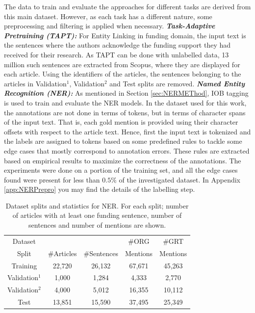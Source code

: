 \documentclass{report}
\theoremstyle{definition}
\theoremstyle{remark}
\begin{document}
The data to train and evaluate the approaches for different tasks are derived from this main dataset. However, as each task has a different nature, some preprocessing and filtering is applied when necessary. 
\newline
\newline
\textit{\textbf{Task-Adaptive Pretraining (TAPT):}} For Entity Linking in funding domain, the input text is the sentences where the authors acknowledge the funding support they had received for their research. As TAPT can be done with unlabelled data, 13 million such sentences are extracted from Scopus, where they are displayed for each article. Using the identifiers of the articles, the sentences belonging to the articles in Validation$^1$, Validation$^2$ and Test splits are removed.
\newline
\newline
\textit{\textbf{Named Entity Recognition (NER):}} As mentioned in Section \ref{sec:NERMEThod}, IOB tagging is used to train and evaluate the NER models. In the dataset used for this work, the annotations are not done in terms of tokens, but in terms of character spans of the input text. That is, each gold mention is provided using their character offsets with respect to the article text. Hence, first the input text is tokenized and the labels are assigned to tokens based on some predefined rules to tackle some edge cases that mostly correspond to annotation errors. These rules are extracted based on empirical results to maximize the correctness of the annotations. The experiments were done on a portion of the training set, and all the edge cases found were present for less than $0.5\%$ of the investigated dataset. In Appendix \ref{app:NERPrepro} you may find the details of the labelling step. 

\begin{table}[h!]
    \centering
    \begin{tabular}{ccccc}
    Dataset &  &  &\#ORG& \#GRT  \\
    Split & \#Articles & \#Sentences &Mentions&Mentions \\
    \hline
    Training   &22,720&26,132& 67,671 &45,263 \\
    Validation$^{1}$ &1,000&1,284&4,333&2,770\\
    Validation$^{2}$ &4,000&5,012&16,355 & 10,112\\
    Test & 13,851 & 15,590 &37,495&25,349\\
    \end{tabular}
    \caption{Dataset splits and statistics for NER. For each split; number of articles with at least one funding sentence, number of sentences and number of mentions are shown.}
    \label{tab:goldstatsner}
\end{table}
\end{document}
